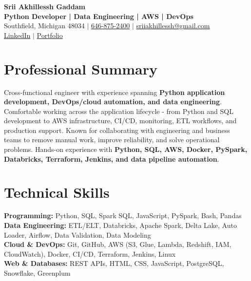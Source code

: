 \documentclass[letterpaper,10pt]{article}
\begin{document}
\fontsize{9.35pt}{10.45pt}\selectfont

\begin{center}
    {\LARGE \textbf{Srii Akhillessh Gaddam}} \\[-1pt]
    \textbf{Python Developer | Data Engineering | AWS | DevOps} \\[2pt]
    Southfield, Michigan 48034 $|$
    \href{tel:6468752400}{646-875-2400} $|$
    \href{mailto:sriiakhillessh@gmail.com}{sriiakhillessh@gmail.com} \\[1pt]
    \href{https://www.linkedin.com/in/srii-akhiilessh-gaddam-b48668191/}{LinkedIn} $|$
    \href{https://sriiakhillesshg.github.io/portfolio/}{Portfolio}
\end{center}
\vspace{-8pt}

\section{Professional Summary}
\small{Cross-functional engineer with experience spanning \textbf{Python application development, DevOps/cloud automation, and data engineering}. Comfortable working across the application lifecycle - from Python and SQL development to AWS infrastructure, CI/CD, monitoring, ETL workflows, and production support. Known for collaborating with engineering and business teams to remove manual work, improve reliability, and solve operational problems. Hands-on experience with \textbf{Python, SQL, AWS, Docker, PySpark, Databricks, Terraform, Jenkins, and data pipeline automation}.}

\section{Technical Skills}
\small{
\textbf{Programming:} Python, SQL, Spark SQL, JavaScript, PySpark, Bash, Pandas \\
\textbf{Data Engineering:} ETL/ELT, Databricks, Apache Spark, Delta Lake, Auto Loader, Airflow, Data Validation, Data Modeling \\
\textbf{Cloud \& DevOps:} Git, GitHub, AWS (S3, Glue, Lambda, Redshift, IAM, CloudWatch), Docker, CI/CD, Terraform, Jenkins, Linux \\
\textbf{Web \& Databases:} REST APIs, HTML, CSS, JavaScript, PostgreSQL, Snowflake, Greenplum
}
\end{document}
